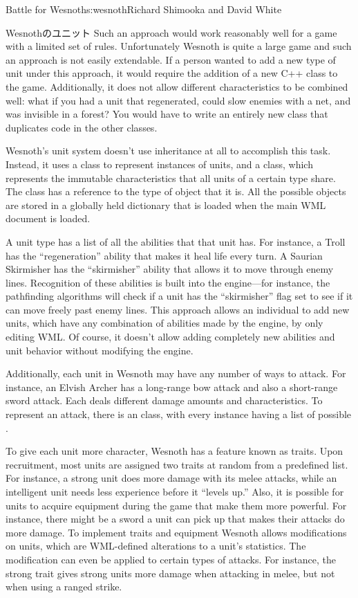 \begin{aosachapter}{Battle for Wesnoth}{s:wesnoth}{Richard Shimooka and David White}
\begin{aosasect1}{Wesnothのユニット}
Such an approach would work reasonably well for a game with a limited
set of rules. Unfortunately Wesnoth is quite a large game and such an
approach is not easily extendable. If a person wanted to add a new
type of unit under this approach, it would require the addition of a
new C++ class to the game. Additionally, it does not allow different
characteristics to be combined well: what if you had a unit that
regenerated, could slow enemies with a net, and was invisible in a
forest? You would have to write an entirely new class that duplicates
code in the other classes.

Wesnoth's unit system doesn't use inheritance at all to accomplish
this task. Instead, it uses a  class to represent instances
of units, and a  class, which represents the
immutable characteristics that all units of a certain type share. The
 class has a reference to the type of object that it is.
All the possible  objects are stored in a globally
held dictionary that is loaded when the main WML document is loaded.

A unit type has a list of all the abilities that that unit has. For
instance, a Troll has the ``regeneration'' ability that makes it heal
life every turn. A Saurian Skirmisher has the ``skirmisher'' ability
that allows it to move through enemy lines. Recognition of these
abilities is built into the engine---for instance, the pathfinding
algorithms will check if a unit has the ``skirmisher'' flag set to see
if it can move freely past enemy lines. This approach allows an
individual to add new units, which have any combination of abilities
made by the engine, by only editing WML\@. Of course, it doesn't allow
adding completely new abilities and unit behavior without modifying
the engine.

Additionally, each unit in Wesnoth may have any number of ways to
attack.  For instance, an Elvish Archer has a long-range bow attack
and also a short-range sword attack. Each deals different damage
amounts and characteristics. To represent an attack, there is an
 class, with every  instance
having a list of possible .

To give each unit more character, Wesnoth has a feature known as
traits. Upon recruitment, most units are assigned two traits at random
from a predefined list. For instance, a strong unit does more damage
with its melee attacks, while an intelligent unit needs less
experience before it ``levels up.'' Also, it is possible for units to
acquire equipment during the game that make them more powerful. For
instance, there might be a sword a unit can pick up that makes their
attacks do more damage. To implement traits and equipment Wesnoth
allows modifications on units, which are WML-defined alterations to a
unit's statistics. The modification can even be applied to certain
types of attacks. For instance, the strong trait gives strong units
more damage when attacking in melee, but not when using a ranged
strike.


\end{aosasect1}
\end{aosachapter}
